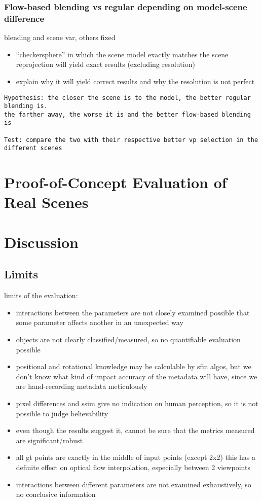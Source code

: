 \subsubsection{Flow-based blending vs regular depending on model-scene difference}
blending and scene var, others fixed
\begin{itemize}
  \item ``checkersphere'' in which the scene model exactly matches the scene
    \ar reprojection will yield exact results (excluding resolution)
  \item explain why it will yield correct results and why the resolution is not perfect
\end{itemize}
\begin{verbatim}
Hypothesis: the closer the scene is to the model, the better regular blending is.
the farther away, the worse it is and the better flow-based blending is

Test: compare the two with their respective better vp selection in the different scenes

\end{verbatim}


\section{Proof-of-Concept Evaluation of Real Scenes}

\section{Discussion}

\subsection{Limits}

limits of the evaluation:
\begin{itemize}
  \item interactions between the parameters are not closely examined \ar possible that some parameter affects another in an unexpected way
  \item objects are not clearly classified/measured, so no quantifiable evaluation possible
  \item positional and rotational knowledge may be calculable by sfm algos, but we don't know what kind of impact accuracy of the metadata will have, since we are hand-recording metadata meticulously
  \item pixel differences and ssim give no indication on human perception, so it is not possible to judge believability
  \item even though the results suggest it, cannot be sure that the metrics measured are significant/robust
  \item all gt points are exactly in the middle of input points (except 2x2) this has a definite effect on optical flow interpolation, especially between 2 viewpoints
  \item interactions between different parameters are not examined exhaustively, so no conclusive information
\end{itemize}

